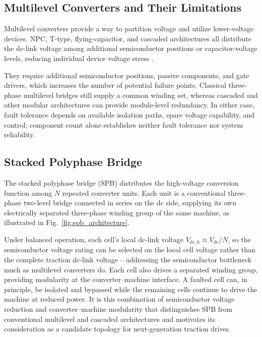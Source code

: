 \subsection{Multilevel Converters and Their Limitations}

Multilevel converters provide a way to partition voltage and utilize
lower-voltage devices.
NPC, T-type, flying-capacitor, and cascaded architectures all distribute
the dc-link voltage among
additional semiconductor positions or capacitor-voltage levels,
reducing individual device voltage stress
\cite{Poorfakhraei2021MultilevelReview,T_type_SiC,FlyingCap_Optimized3D,CascadedHBridge_control}.

They require additional semiconductor positions, passive components,
and gate drivers, which increases the number of potential failure points. Classical three-phase multilevel
bridges still supply a common winding set, whereas cascaded and other
modular architectures can provide module-level redundancy. In either
case, fault tolerance depends on available isolation paths, spare
voltage capability, and control; component count alone establishes
neither fault tolerance nor system reliability.

\subsection{Stacked Polyphase Bridge}
\label{sec:spb_modularity}

The stacked polyphase bridge (SPB) distributes the
high-voltage conversion function among $N$ repeated converter units.
Each unit is a conventional three-phase two-level bridge connected in
series on the dc side, supplying its own electrically separated
three-phase winding group of the same machine, as illustrated in
Fig.~\ref{fig:spb_architecture}.

Under balanced operation, each cell's local dc-link voltage
$V_{\mathrm{dc},k}\approx V_{\mathrm{dc}}/N$, so the semiconductor
voltage rating can be selected on the local cell voltage rather than
the complete traction dc-link voltage -- addressing the semiconductor
bottleneck much as multilevel converters do. Each cell also drives a separated winding group, providing
modularity at the converter--machine interface.
A faulted cell can, in principle, be isolated and bypassed while the
remaining cells continue to drive the machine at reduced power. It is
this combination of semiconductor voltage reduction and
converter--machine modularity that distinguishes SPB from conventional
multilevel and cascaded architectures and motivates its consideration
as a candidate topology for next-generation traction drives.

